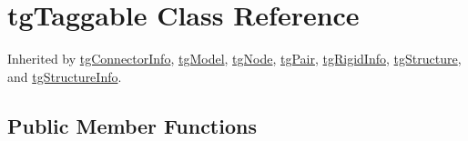\hypertarget{classtg_taggable}{\section{tg\-Taggable Class Reference}
\label{classtg_taggable}
}


Inherited by \hyperlink{classtg_connector_info}{tg\-Connector\-Info}, \hyperlink{classtg_model}{tg\-Model}, \hyperlink{classtg_node}{tg\-Node}, \hyperlink{classtg_pair}{tg\-Pair}, \hyperlink{classtg_rigid_info}{tg\-Rigid\-Info}, \hyperlink{classtg_structure}{tg\-Structure}, and \hyperlink{classtg_structure_info}{tg\-Structure\-Info}.

\subsection*{Public Member Functions}

